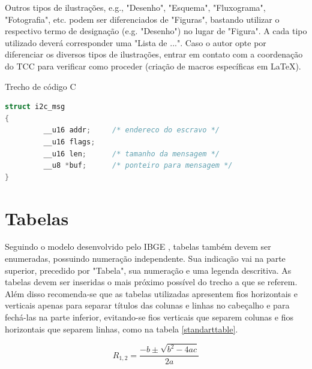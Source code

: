 \documentclass[repeatfields,xlists,xpacks,oneside]{ufrgscca}
\begin{document}
Outros tipos de ilustrações, e.g.,   "Desenho", "Esquema", "Fluxograma", "Fotografia", etc. podem ser diferenciados de "Figuras", bastando utilizar o respectivo termo de designação (e.g. "Desenho") no lugar de "Figura". A cada tipo utilizado deverá corresponder uma "Lista de ...". Caso o autor opte por diferenciar os diversos tipos de ilustrações, entrar em contato com a coordenação do TCC para verificar como proceder (criação de macros específicas em \LaTeX).





\begin{codelist}[htbp]
\caption{Trecho de código C}
\label{code01}
\begin{lstlisting}[language=C]
struct i2c_msg
{
         __u16 addr;     /* endereco do escravo */
         __u16 flags;
         __u16 len;      /* tamanho da mensagem */
         __u8 *buf;      /* ponteiro para mensagem */
}
\end{lstlisting}
{}
\end{codelist}



\section{Tabelas}

Seguindo o modelo desenvolvido pelo IBGE \cite{IBGE:tabular-1993}, tabelas também devem ser enumeradas, possuindo numeração independente. Sua
indicação vai na parte superior, precedido por "Tabela", sua numeração e uma
legenda descritiva. As tabelas devem ser inseridas o
mais próximo possível do trecho a que se referem.
 Além disso recomenda-se que as tabelas utilizadas apresentem fios
horizontais e verticais apenas para separar títulos das colunas e linhas no
cabeçalho e para fechá-las na parte inferior, evitando-se fios verticais que
separem colunas e fios horizontais que separem linhas, como na tabela \ref{standarttable}.

\begin{equation}
    R_{1,2}=\frac{-b\pm\sqrt{b^2-4ac}}{2a}
\end{equation}
\end{document}
